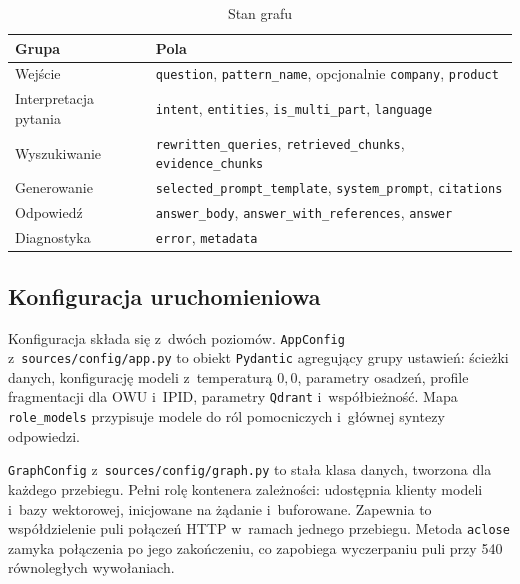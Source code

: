 \begin{table}[H]
  \caption{Stan grafu}\label{tab:stan-grafu}
  \centering
  \small
  \begin{tabular}{@{} l p{7cm} @{}}
    \toprule
    \textbf{Grupa}
    & \textbf{Pola}                                             \\
    \midrule
    Wejście
    & \texttt{question}, \texttt{pattern\_name},
    opcjonalnie \texttt{company}, \texttt{product}               \\
    Interpretacja pytania
    & \texttt{intent}, \texttt{entities},
    \texttt{is\_multi\_part}, \texttt{language}                  \\
    Wyszukiwanie
    & \texttt{rewritten\_queries}, \texttt{retrieved\_chunks},
    \texttt{evidence\_chunks}                                    \\
    Generowanie
    & \texttt{selected\_prompt\_template},
    \texttt{system\_prompt}, \texttt{citations}                  \\
    Odpowiedź
    & \texttt{answer\_body}, \texttt{answer\_with\_references},
    \texttt{answer}                                              \\
    Diagnostyka
    & \texttt{error}, \texttt{metadata}                         \\
    \bottomrule
  \end{tabular}
\end{table}

\subsection{Konfiguracja uruchomieniowa}\label{subsec:konfiguracja-uruchomieniowa}

Konfiguracja składa się z~dwóch poziomów. \texttt{AppConfig}
z~\texttt{sources/config/app.py} to obiekt \texttt{Pydantic} agregujący grupy
ustawień: ścieżki danych, konfigurację modeli z~temperaturą \(0{,}0\),
parametry osadzeń, profile fragmentacji dla OWU i~IPID, parametry
\texttt{Qdrant} i~współbieżność. Mapa \texttt{role\_models} przypisuje modele
do ról pomocniczych i~głównej syntezy odpowiedzi.

\texttt{GraphConfig} z~\texttt{sources/config/graph.py} to stała
klasa danych, tworzona dla każdego przebiegu. Pełni rolę kontenera
zależności: udostępnia klienty modeli i~bazy wektorowej, inicjowane na żądanie
i~buforowane. Zapewnia to współdzielenie puli połączeń
HTTP w~ramach jednego przebiegu. Metoda \texttt{aclose} zamyka połączenia po jego zakończeniu,
co zapobiega wyczerpaniu puli przy 540 równoległych wywołaniach.


